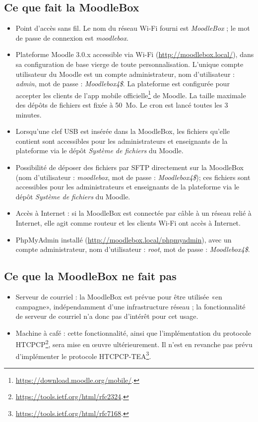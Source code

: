 \documentclass[11pt]{article}
\begin{document}
\subsection{Ce que fait la MoodleBox}

\begin{itemize}
\item Point d'accès sans fil. Le nom du réseau Wi-Fi fourni est \emph{MoodleBox} ; le mot de passe de connexion est \emph{moodlebox}.
\item Plateforme Moodle 3.0.x accessible via Wi-Fi (\url{http://moodlebox.local/}), dans sa configuration de base vierge de toute personnalisation. L'unique compte utilisateur du Moodle est un compte administrateur, nom d'utilisateur : \emph{admin}, mot de passe : \emph{Moodlebox4\$}. La plateforme est configurée pour accepter les clients de l'app mobile officielle\footnote{\url{https://download.moodle.org/mobile/}.} de Moodle. La taille maximale des dépôts de fichiers est fixée à 50~Mo. Le cron est lancé toutes les 3 minutes.
\item Lorsqu'une clef USB est insérée dans la MoodleBox, les fichiers qu'elle contient sont accessibles pour les administrateurs et enseignants de la plateforme via le dépôt \emph{Système de fichiers} du Moodle.
\item Possibilité de déposer des fichiers par SFTP directement sur la MoodleBox (nom d'utilisateur : \emph{moodlebox}, mot de passe : \emph{Moodlebox4\$}); ces fichiers sont accessibles pour les administrateurs et enseignants de la plateforme via le dépôt \emph{Système de fichiers} du Moodle.
\item Accès à Internet : si la MoodleBox est connectée par câble à un réseau relié à Internet, elle agit comme routeur et les clients Wi-Fi ont accès à Internet.
\item PhpMyAdmin installé (\url{http://moodlebox.local/phpmyadmin}), avec un compte administrateur, nom d'utilisateur : \emph{root}, mot de passe : \emph{Moodlebox4\$}.
\end{itemize}

\subsection{Ce que la MoodleBox ne fait pas}

\begin{itemize}
\item Serveur de courriel : la MoodleBox est prévue pour être utilisée «en campagne», indépendamment d'une infrastructure réseau ; la fonctionnalité de serveur de courriel n'a donc pas d'intérêt pour cet usage.
\item Machine à café : cette fonctionnalité, ainsi que l'implémentation du protocole HTCPCP\footnote{\url{https://tools.ietf.org/html/rfc2324}.}, sera mise en œuvre ultérieurement. Il n'est en revanche pas prévu d'implémenter le protocole HTCPCP-TEA\footnote{\url{https://tools.ietf.org/html/rfc7168}.}.
\end{itemize}
\end{document}
